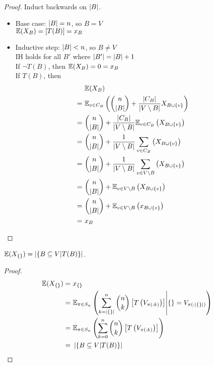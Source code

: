 \documentclass{article}
\begin{document}
\begin{proof}
Induct backwards on $\left\vert B \right\vert$.
\begin{itemize}
\item
  Base case: $\left\vert B \right\vert = n$, so $B = V$ \\
  $\mathbb{E}(X_B) = [T(B)] = x_B$
\item
  Inductive step: $\left\vert B \right\vert < n$, so $B \neq V$ \\
  IH holds for all $B'$ where $\left\vert B' \right\vert = \left\vert B \right\vert+1$ \\
  If $\lnot T(B)$, then $\mathbb{E}(X_B) = 0 = x_B$ \\
  If $T(B)$, then
  \begin{align*}
    &\mathbb{E}(X_B) \\
    =\ &\mathbb{E}_{v \in C_B}\left(\binom{n}{\left\vert B \right\vert}+\frac{\left\vert C_B \right\vert}{\left\vert V \setminus B \right\vert}X_{B \cup \{v\}}\right) \\
    =\ &\binom{n}{\left\vert B \right\vert}+\frac{\left\vert C_B \right\vert}{\left\vert V \setminus B \right\vert}\mathbb{E}_{v \in C_B}\left(X_{B \cup \{v\}}\right) \\
    =\ &\binom{n}{\left\vert B \right\vert}+\frac{1}{\left\vert V \setminus B \right\vert}\sum_{v \in C_B}\left(X_{B \cup \{v\}}\right) \\
    =\ &\binom{n}{\left\vert B \right\vert}+\frac{1}{\left\vert V \setminus B \right\vert}\sum_{v \in V \setminus B}\left(X_{B \cup \{v\}}\right) \\
    =\ &\binom{n}{\left\vert B \right\vert}+\mathbb{E}_{v \in V \setminus B}\left(X_{B \cup \{v\}}\right) \\
    =\ &\binom{n}{\left\vert B \right\vert}+\mathbb{E}_{v \in V \setminus B}\left(x_{B \cup \{v\}}\right) \\
    =\ &x_B
  \end{align*}
\end{itemize}
\end{proof}
\begin{theorem}
$\mathbb{E}(X_{\{\}}) = \left\vert \left\{B \subseteq V \middle| T(B)\right\} \right\vert$.
\end{theorem}
\begin{proof}
  \begin{align*}
    \mathbb{E}(X_{\{\}})
    =\ &x_{\{\}} \\
    =\ &\mathbb{E}_{\pi \in S_n}\left(\sum_{k=\left\vert \{\} \right\vert}^n\binom{n}{k}\left[T\left(V_{\pi(:k)}\right)\right] \middle| \{\} = V_{\pi(:\left\vert \{\} \right\vert)}\right) \\
    =\ &\mathbb{E}_{\pi \in S_n}\left(\sum_{k=0}^n\binom{n}{k}\left[T\left(V_{\pi(:k)}\right)\right]\right) \\
    =\ &\left\vert \left\{B \subseteq V \middle| T(B)\right\} \right\vert
  \end{align*}
\end{proof}
\end{document}

